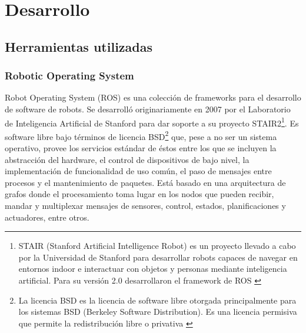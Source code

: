 

\usepackage[
backend=biber,
style=numeric,
sorting=none,
dateabbrev=false,
citestyle=numeric
]{biblatex}





\pagestyle{fancy}

\maketitle

\tableofcontents



\part{Desarrollo}

\chapter{Herramientas utilizadas}

\section{Robotic Operating System}

Robot Operating System (ROS) es una colección de frameworks para el desarrollo de software de robots. Se desarrolló originariamente en 2007 por el Laboratorio de Inteligencia Artificial de Stanford para dar soporte a su proyecto STAIR2\footnote{STAIR (Stanford Artificial Intelligence Robot) es un proyecto llevado a cabo por la Universidad de Stanford para desarrollar robots capaces de navegar en entornos indoor e interactuar con objetos y personas mediante inteligencia artificial. Para su versión 2.0 desarrollaron el framework de ROS \cite{stair}}. Es software libre bajo términos de licencia BSD\footnote{La licencia BSD es la licencia de software libre otorgada principalmente para los sistemas BSD (Berkeley Software Distribution). Es una licencia permisiva que permite la redistribución libre o privativa \cite{licencia}} que, pese a no ser un sistema operativo, provee los servicios estándar de éstos entre los que se incluyen la abstracción del hardware, el control de dispositivos de bajo nivel, la implementación de funcionalidad de uso común, el paso de mensajes entre procesos y el mantenimiento de paquetes. Está basado en una arquitectura de grafos donde el procesamiento toma lugar en los nodos que pueden recibir, mandar y multiplexar mensajes de sensores, control, estados, planificaciones y actuadores, entre otros.\\

